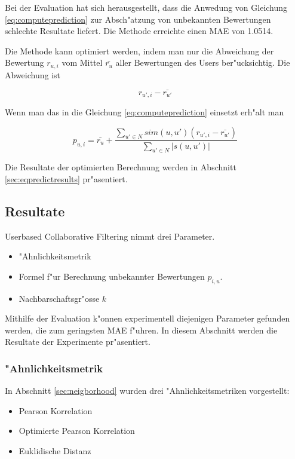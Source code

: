 \documentclass[a4paper, 12pt]{article}
\begin{document}
Bei der Evaluation hat sich herausgestellt, dass die Anwedung von Gleichung \ref{eq:computeprediction} zur Absch"atzung von unbekannten Bewertungen schlechte Resultate liefert. Die Methode erreichte einen MAE von 1.0514. 

Die Methode kann optimiert werden, indem man nur die Abweichung der Bewertung $r_{u,i}$ vom Mittel $\bar{r_u}$  aller Bewertungen des Users ber"ucksichtig. Die Abweichung ist

\begin{equation}
  \label{eq:dev2}
r_{u',i} - \bar{r_{u'}}
\end{equation}

Wenn man das in die Gleichung \ref{eq:computeprediction} einsetzt erh"alt man

\begin{equation}
  \label{eq:optcomputeprediction}
  p_{u,i} = \bar{r_u} + \frac{\sum_{u' \in N}{sim(u,u') (r_{u',i} - \bar{r_{u'}})}}{\sum_{u' \in N}{|s(u,u')|}}
\end{equation}

Die Resultate der optimierten Berechnung werden in Abschnitt \ref{sec:eqpredictresults} pr"asentiert.

\subsection{Resultate}
\label{sec:userbasedresults}

Userbased Collaborative Filtering nimmt drei Parameter.
\begin{itemize}
\item "Ahnlichkeitsmetrik
\item Formel f"ur Berechnung unbekannter Bewertungen $p_{i,u}$.
\item Nachbarschaftsgr"osse $k$
\end{itemize}

Mithilfe der Evaluation k"onnen experimentell diejenigen Parameter gefunden werden, die zum geringsten MAE f"uhren. In diesem Abschnitt werden die Resultate der Experimente pr"asentiert. 

\subsubsection{"Ahnlichkeitsmetrik}
\label{sec:simresults}

In Abschnitt \ref{sec:neigborhood} wurden drei "Ahnlichkeitsmetriken vorgestellt:

\begin{itemize}
\item Pearson Korrelation
\item Optimierte Pearson Korrelation
\item Euklidische Distanz
\end{itemize}
\end{document}
